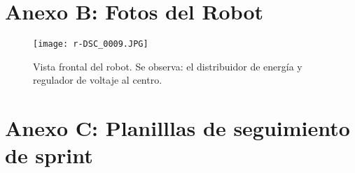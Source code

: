 

\section*{Anexo B: Fotos del Robot}

\begin{figure}
    \centering
    \texttt{[image: r-DSC\_0009.JPG]}
    \caption{Vista frontal del robot. Se observa: el distribuidor de energía y regulador de voltaje al centro.}
\end{figure}

\newpage
{}
\section*{Anexo C: Planilllas de seguimiento de sprint}


